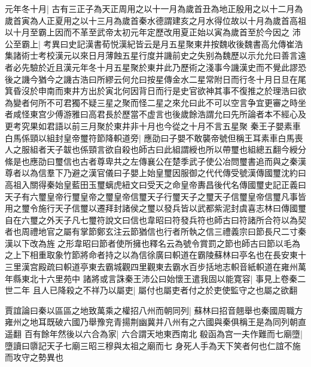 元年冬十月|{
	古有三正子為天正周用之以十一月為歲首丑為地正殷用之以十二月為歲首寅為人正夏用之以十三月為歲首秦水德謂建亥之月水得位故以十月為歲首高祖以十月至霸上因而不革至武帝太初元年定歷改用夏正始以寅為歲首至於今因之}
沛公至霸上|{
	考異曰史記漢書荀悦漢紀皆云是月五星聚東井按魏收後魏書高允傳崔浩集諸術士考校漢元以來日月薄蝕五星行度并譏前史之失别為魏歷以示允允曰善言遠者必先驗於近且漢元年冬十月五星聚於東井此乃歷術之淺事今譏漢史而不覺此謬恐後之譏今猶今之譏古浩曰所繆云何允曰按星傳金水二星常附日而行冬十月日旦在尾箕昏沒於申南而東井方出於寅北何因背日而行是史官欲神其事不復推之於理浩曰欲為變者何所不可君獨不疑三星之聚而怪二星之來允曰此不可以空言争宜更審之時坐者咸怪東宫少傅游雅曰高君長於歷當不虚言也後歲餘浩謂允曰先所論者本不經心及更考究果如君語以前三月聚於東井非十月也今從之十月不言五星聚}
秦王子嬰素車白馬係頸以組封皇帝璽符節降軹道旁|{
	應劭曰子嬰不敢襲帝號但稱王耳素車白馬喪人之服組者天子韍也係頸言欲自殺也師古曰此組謂綬也所以帶璽也組總五翻今綬分絛是也應劭曰璽信也古者尊卑共之左傳襄公在楚季武子使公冶問璽書追而與之秦漢尊者以為信羣下乃避之漢官儀曰子嬰上始皇璽因服御之代代傳受號漢傳國璽沈約曰高祖入關得秦始皇藍田玉璽螭虎紐文曰受天之命皇帝夀昌後代名傳國璽史記正義曰天子有六璽皇帝行璽皇帝之璽皇帝信璽天子行璽天子之璽天子信璽皇帝信璽凡事皆用之璽令施行天子信璽以遷拜封諸侯之璽以發兵皆以武都紫泥封虞喜志林曰傳國璽自在六璽之外天子凡七璽符說文曰信也韋昭曰符發兵符也師古曰符諸所合符以為契者也周禮地官之屬有掌節鄭玄注云節猶信也行者所執之信三禮義宗曰節長尺二寸秦漢以下改為旌之形韋昭曰節者使所擁也釋名云為號令賞罰之節也師古曰節以毛為之上下相重取象竹節將命者持之以為信徐廣曰軹道在霸陵蘇林曰亭名也在長安東十三里漢宫殿疏曰軹道亭東去霸城觀四里觀東去霸水百步括地志軹音紙軹道在雍州萬年縣東北十六里苑中}
諸將或言誅秦王沛公曰始懷王遣我固以能寛容|{
	事見上卷秦二世二年}
且人已降殺之不祥乃以屬吏|{
	屬付也屬吏者付之於吏使監守之也屬之欲翻}


賈誼論曰秦以區區之地致萬乘之權招八州而朝同列|{
	蘇林曰招音翹舉也秦國周職方雍州之地耳既破六國乃舉豫兖青揚荆幽冀并八州有之六國與秦俱稱王是為同列朝直遥翻}
百有餘年然後以六合為家|{
	六合謂天地東西南北}
殽函為宫一夫作難而七廟墮|{
	墮讀曰隳記天子七廟三昭三穆與太祖之廟而七}
身死人手為天下笑者何也仁誼不施而攻守之勢異也

